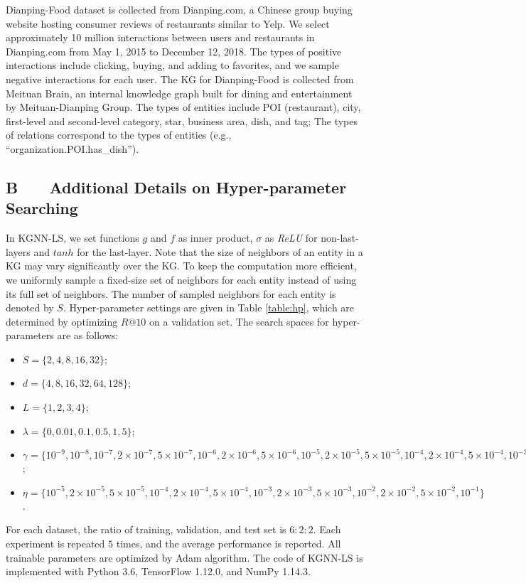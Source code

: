 \documentclass[sigconf]{acmart}
\begin{document}
		Dianping-Food dataset is collected from Dianping.com, a Chinese group buying website hosting consumer reviews of restaurants similar to Yelp.
		We select approximately 10 million interactions between users and restaurants in Dianping.com from May 1, 2015 to December 12, 2018.
		The types of positive interactions include clicking, buying, and adding to favorites, and we sample negative interactions for each user.
		The KG for Dianping-Food is collected from Meituan Brain, an internal knowledge graph built for dining and entertainment by Meituan-Dianping Group.
		The types of entities include POI (restaurant), city, first-level and second-level category, star, business area, dish, and tag;
		The types of relations correspond to the types of entities (e.g., ``organization.POI.has\_dish'').
		

	
	\subsection*{B \ \ \ Additional Details on Hyper-parameter Searching}
		In KGNN-LS, we set functions $g$ and $f$ as inner product, $\sigma$ as \textit{ReLU} for non-last-layers and $tanh$ for the last-layer.
		Note that the size of neighbors of an entity in a KG may vary significantly over the KG.
		To keep the computation more efficient, we uniformly sample a fixed-size set of neighbors for each entity instead of using its full set of neighbors.
		The number of sampled neighbors for each entity is denoted by $S$.
		Hyper-parameter settings are given in Table \ref{table:hp}, which are determined by optimizing $R@10$ on a validation set.
		The search spaces for hyper-parameters are as follows:
		\begin{itemize}
			\item $S = \{2, 4, 8, 16, 32\}$;
			\item $d = \{4, 8, 16, 32, 64, 128\}$;
			\item $L = \{1, 2, 3, 4\}$;
			\item $\lambda = \{0, 0.01, 0.1, 0.5, 1, 5\}$;
			\item $\gamma = \{ 10^{-9}, 10^{-8}, 10^{-7}, 2 \times 10^{-7}, 5 \times 10^{-7}, 10^{-6}, 2 \times 10^{-6}, 5 \times 10^{-6}, 10^{-5}, 2 \times 10^{-5}, 5 \times 10^{-5}, 10^{-4}, 2 \times 10^{-4}, 5 \times 10^{-4}, 10^{-3} \}$;
			\item $\eta = \{10^{-5}, 2 \times 10^{-5}, 5 \times 10^{-5}, 10^{-4}, 2 \times 10^{-4}, 5 \times 10^{-4}, 10^{-3}, 2 \times 10^{-3}, 5 \times 10^{-3}, 10^{-2}, 2 \times 10^{-2}, 5 \times 10^{-2}, 10^{-1}\}$.
		\end{itemize}
		For each dataset, the ratio of training, validation, and test set is $6:2:2$.
		Each experiment is repeated $5$ times, and the average performance is reported.
		All trainable parameters are optimized by Adam algorithm.
		The code of KGNN-LS is implemented with Python 3.6, TensorFlow 1.12.0, and NumPy 1.14.3.
		
\end{document}
